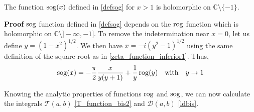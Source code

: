 \begin{lemma}
\label{lemma_sog}
The function ${\rm sog}(x)$ defined in \eqref{defsog} for $x>1$ is holomorphic on $\mathbb{C}\setminus \{-1\}$.
\end{lemma}


{\bf Proof}
${\rm sog}$ function defined in \eqref{defsog} depends on the $\rm rog$ function which is holomorphic on $\mathbb{C}\setminus \rbrack - \infty, -1 \rbrack$. To remove the indetermination near $x=0$, let us define $y=\left( 1-x^2 \right)^{1/2}$. We then have $x = -i \left( y^2 -1 \right)^{1/2} $ using the same definition of the square root as in \eqref{zeta_function_inferior1}. Thus,
\begin{equation}
{\rm sog}(x) = - \dfrac{\pi}{2} \dfrac{x}{y(y+1)} + \dfrac{1}{y} \, {\rm rog}(y) \quad \text{with} \quad y \rightarrow  1
\end{equation}

Knowing the analytic properties of functions $\rm rog$ and ${\rm sog}$, we can now calculate the integrals $\mathcal{T}(a,b)$ \eqref{T_function_bis2} and $\mathcal{D}(a,b)$ \eqref{ldbis}.

